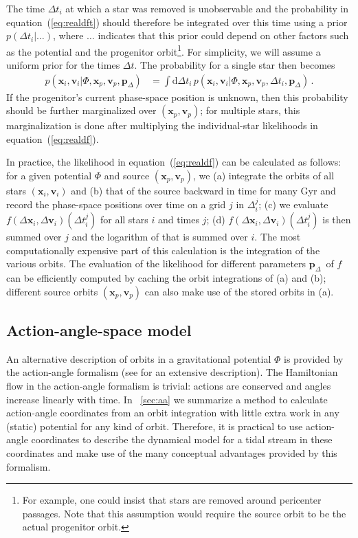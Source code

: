 \documentclass[12pt,preprint]{aastex}
\newcommand{\dd}{\mathrm{d}}
\newcommand{\eqnname}{equation}
\renewcommand{\vec}[1]{\ensuremath{\mathbf{#1}}}
\newcommand{\vecx}{\ensuremath{\vec{x}}}
\newcommand{\vecv}{\ensuremath{\vec{v}}}
\newcommand{\paramsdiff}{\ensuremath{\vec{p}_\Delta}}
\begin{document}
The time $\Delta t_i$ at which a star was removed is unobservable and
the probability in \eqnname~(\ref{eq:realdft}) should therefore be
integrated over this time using a prior $p(\Delta t_i|\ldots)$, where
$\ldots$ indicates that this prior could depend on other factors such
as the potential and the progenitor orbit\footnote{For example, one
  could insist that stars are removed around pericenter passages. Note
  that this assumption would require the source orbit to be the actual
  progenitor orbit.}. For simplicity, we will assume a uniform prior
for the times $\Delta t$. The probability for a single star then becomes
\begin{align}\label{eq:realdf}
  p(\vecx_i,\vecv_i | \Phi,\vecx_p,\vecv_p,\paramsdiff) & = \int \dd
  \Delta t_i \,p(\vecx_i,\vecv_i | \Phi,\vecx_p,\vecv_p,\Delta t_i,
  \paramsdiff)\,.
\end{align}
If the progenitor's current phase-space position is unknown, then this
probability should be further marginalized over $(\vecx_p,\vecv_p)$;
for multiple stars, this marginalization is done after multiplying the
individual-star likelihoods in \eqnname~(\ref{eq:realdf}).

In practice, the likelihood in \eqnname~(\ref{eq:realdf}) can be
calculated as follows: for a given potential $\Phi$ and source
$(\vecx_p,\vecv_p)$, we (a) integrate the orbits of all stars
$(\vecx_i,\vecv_i)$ and (b) that of the source backward in time for
many Gyr and record the phase-space positions over time on a grid $j$
in $\Delta^j_i$; (c) we evaluate $f(\Delta \vecx_i,\Delta
\vecv_i)(\Delta t^j_i)$ for all stars $i$ and times $j$; (d) $f(\Delta
\vecx_i,\Delta \vecv_i)(\Delta t^j_i)$ is then summed over $j$ and the
logarithm of that is summed over $i$. The most computationally
expensive part of this calculation is the integration of the various
orbits. The evaluation of the likelihood for different parameters
\paramsdiff\ of $f$ can be efficiently computed by caching the orbit
integrations of (a) and (b); different source orbits
$(\vecx_p,\vecv_p)$ can also make use of the stored orbits in (a).

\subsection{Action-angle-space model}\label{sec:aamethod}


An alternative description of orbits in a gravitational potential
$\Phi$ is provided by the action-angle formalism (see
\citealt{binneytremaine} for an extensive description). The
Hamiltonian flow in the action-angle formalism is trivial: actions are
conserved and angles increase linearly with time. In
\appendixname~\ref{sec:aa} we summarize a method to calculate
action-angle coordinates from an orbit integration with little extra
work in any (static) potential for any kind of orbit. Therefore, it is
practical to use action-angle coordinates to describe the dynamical
model for a tidal stream in these coordinates and make use of the many
conceptual advantages provided by this formalism.
\end{document}
